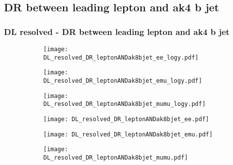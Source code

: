 \documentclass[aspectratio=169,8pt]{beamer}
\begin{document}
\subsection{DR between leading lepton and ak4 b jet}
\begin{frame}
\frametitle{DL resolved - DR between leading lepton and ak4 b jet}
\begin{figure}
\captionsetup[subfigure]{labelformat=empty}
\begin{subfigure}{0.32\textwidth}
\texttt{[image: DL\_resolved\_DR\_leptonANDak8bjet\_ee\_logy.pdf]}
\vspace*{-0.15cm}
\end{subfigure}
\hfil
\begin{subfigure}{0.32\textwidth}
\texttt{[image: DL\_resolved\_DR\_leptonANDak8bjet\_emu\_logy.pdf]}
\vspace*{-0.15cm}
\end{subfigure}
\hfil
\begin{subfigure}{0.32\textwidth}
\texttt{[image: DL\_resolved\_DR\_leptonANDak8bjet\_mumu\_logy.pdf]}
\vspace*{-0.15cm}
\end{subfigure}
\hfil
\begin{subfigure}{0.32\textwidth}
\texttt{[image: DL\_resolved\_DR\_leptonANDak8bjet\_ee.pdf]}
\vspace*{-0.15cm}
\end{subfigure}
\hfil
\begin{subfigure}{0.32\textwidth}
\texttt{[image: DL\_resolved\_DR\_leptonANDak8bjet\_emu.pdf]}
\vspace*{-0.15cm}
\end{subfigure}
\hfil
\begin{subfigure}{0.32\textwidth}
\texttt{[image: DL\_resolved\_DR\_leptonANDak8bjet\_mumu.pdf]}
\vspace*{-0.15cm}
\end{subfigure}
\hfil
\end{figure}
\end{frame}
\newpage
\end{document}
